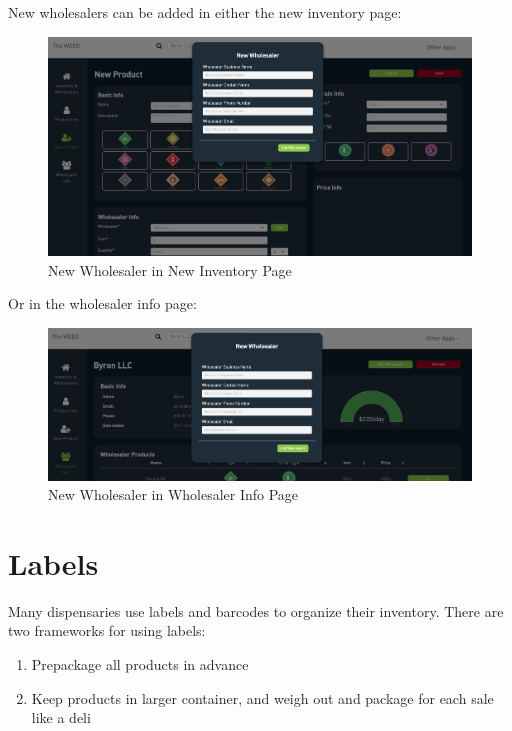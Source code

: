 \documentclass[]{book}
\theoremstyle{definition}
\theoremstyle{definition}
\theoremstyle{definition}
\theoremstyle{remark}
\begin{document}
New wholesalers can be added in either the new inventory page:

\begin{figure}
\centering
\includegraphics{images/newWholesaler.png}
\caption{New Wholesaler in New Inventory Page}
\end{figure}

Or in the wholesaler info page:

\begin{figure}
\centering
\includegraphics{images/newWholesaler2.png}
\caption{New Wholesaler in Wholesaler Info Page}
\end{figure}

\section{Labels}\label{labels}

Many dispensaries use labels and barcodes to organize their inventory.
There are two frameworks for using labels:

\begin{enumerate}
\def\labelenumi{\arabic{enumi}.}
\item
  Prepackage all products in advance
\item
  Keep products in larger container, and weigh out and package for each
  sale like a deli
\end{enumerate}
\end{document}
